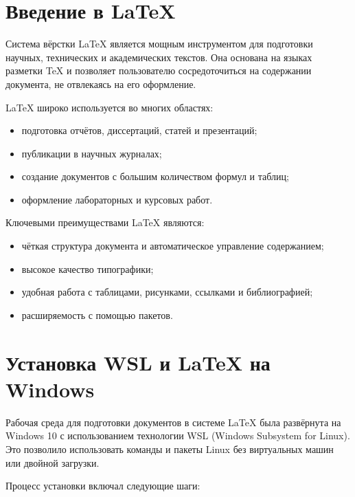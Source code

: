 \documentclass[a4paper,12pt]{report}
\begin{document}
\section{Введение в \LaTeX{}}

Система вёрстки \LaTeX{} является мощным инструментом для подготовки научных, технических и академических текстов. Она основана на языках разметки TeX и позволяет пользователю сосредоточиться на содержании документа, не отвлекаясь на его оформление. 

\LaTeX{} широко используется во многих областях:
\begin{itemize}
    \item подготовка отчётов, диссертаций, статей и презентаций;
    \item публикации в научных журналах;
    \item создание документов с большим количеством формул и таблиц;
    \item оформление лабораторных и курсовых работ.
\end{itemize}

Ключевыми преимуществами \LaTeX{} являются:
\begin{itemize}
    \item чёткая структура документа и автоматическое управление содержанием;
    \item высокое качество типографики;
    \item удобная работа с таблицами, рисунками, ссылками и библиографией;
    \item расширяемость с помощью пакетов.
\end{itemize}


\section{Установка WSL и \LaTeX{} на Windows}

Рабочая среда для подготовки документов в системе \LaTeX{} была развёрнута на Windows 10 с использованием технологии WSL (Windows Subsystem for Linux). Это позволило использовать команды и пакеты Linux без виртуальных машин или двойной загрузки.

Процесс установки включал следующие шаги:
\end{document}
